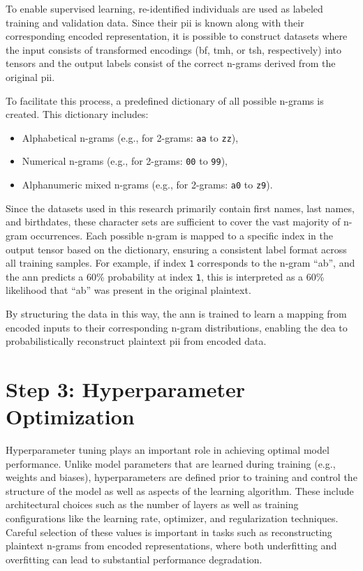 To enable supervised learning, re-identified individuals are used as labeled training and validation data.
Since their \ac{pii} is known along with their corresponding encoded representation, it is possible to construct datasets where the input consists of transformed encodings (\ac{bf}, \ac{tmh}, or \ac{tsh}, respectively) into tensors and the output labels consist of the correct n-grams derived from the original \ac{pii}.

To facilitate this process, a predefined dictionary of all possible n-grams is created. This dictionary includes:
\begin{itemize}
   \item Alphabetical n-grams (e.g., for 2-grams: \texttt{aa} to \texttt{zz}),
   \item Numerical n-grams (e.g., for 2-grams: \texttt{00} to \texttt{99}),
   \item Alphanumeric mixed n-grams (e.g., for 2-grams: \texttt{a0} to \texttt{z9}).
\end{itemize}

Since the datasets used in this research primarily contain first names, last names, and birthdates, these character sets are sufficient to cover the vast majority of n-gram occurrences.
Each possible n-gram is mapped to a specific index in the output tensor based on the dictionary, ensuring a consistent label format across all training samples.
For example, if index \texttt{1} corresponds to the n-gram \enquote{ab}, and the \ac{ann} predicts a 60\% probability at index \texttt{1}, this is interpreted as a 60\% likelihood that \enquote{ab} was present in the original plaintext.

By structuring the data in this way, the \ac{ann} is trained to learn a mapping from encoded inputs to their corresponding n-gram distributions, enabling the \ac{dea} to probabilistically reconstruct plaintext \ac{pii} from encoded data.

\section{Step 3: Hyperparameter Optimization} \label{sec:hmo}

Hyperparameter tuning plays an important role in achieving optimal model performance.
Unlike model parameters that are learned during training (e.g., weights and biases), hyperparameters are defined prior to training and control the structure of the model as well as aspects of the learning algorithm.
These include architectural choices such as the number of layers as well as training configurations like the learning rate, optimizer, and regularization techniques.
Careful selection of these values is important in tasks such as reconstructing plaintext n-grams from encoded representations, where both underfitting and overfitting can lead to substantial performance degradation.


